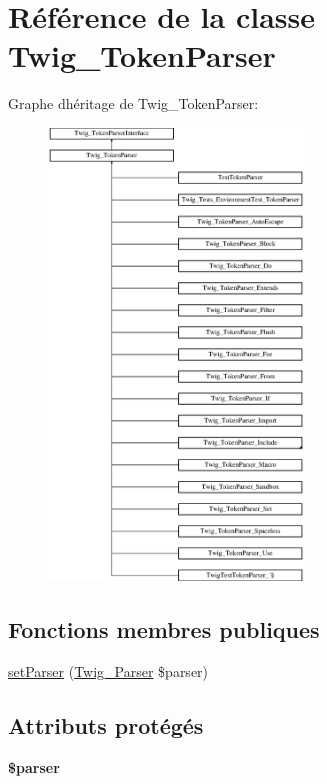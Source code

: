 \hypertarget{class_twig___token_parser}{}\section{Référence de la classe Twig\+\_\+\+Token\+Parser}
\label{class_twig___token_parser}
Graphe d\textquotesingle{}héritage de Twig\+\_\+\+Token\+Parser\+:\begin{figure}[H]
\begin{center}
\leavevmode
\includegraphics[height=12.000000cm]{class_twig___token_parser}
\end{center}
\end{figure}
\subsection*{Fonctions membres publiques}
\begin{DoxyCompactItemize}
\item 
\hyperlink{class_twig___token_parser_a68fca2cbecd7ee6643879ae3d5c6f129}{set\+Parser} (\hyperlink{class_twig___parser}{Twig\+\_\+\+Parser} \$parser)
\end{DoxyCompactItemize}
\subsection*{Attributs protégés}
\begin{DoxyCompactItemize}
\item 
{\bfseries \$parser}\hypertarget{class_twig___token_parser_a147a766daa03d52576c7345fea31c945}{}\label{class_twig___token_parser_a147a766daa03d52576c7345fea31c945}

\end{DoxyCompactItemize}


